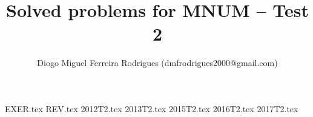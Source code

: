 \documentclass{mnum}
\title{Solved problems for MNUM -- Test 2}
\author{Diogo Miguel Ferreira Rodrigues (dmfrodrigues2000@gmail.com)}
\date{}
\begin{document}
\begingroup
\maketitle
	\let\clearpage\relax
	\tableofcontents
\endgroup
{EXER.tex}
{REV.tex}
{2012T2.tex}
{2013T2.tex}
{2015T2.tex}
{2016T2.tex}
{2017T2.tex}
\end{document}
